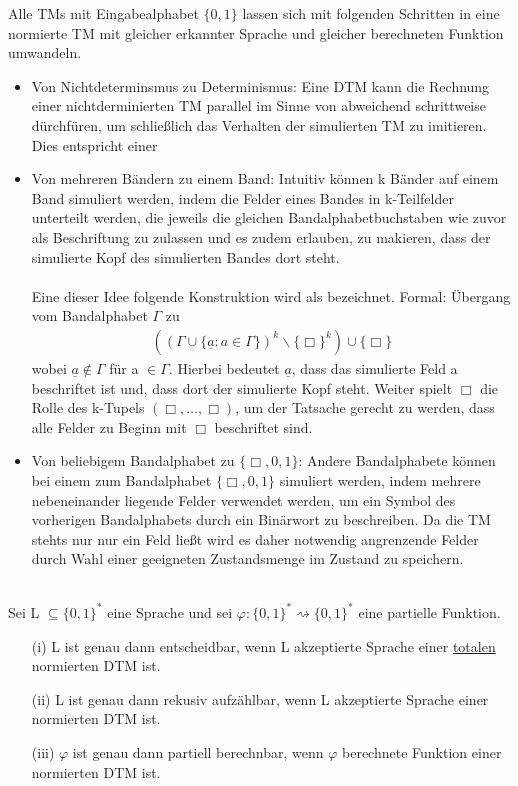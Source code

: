 \documentclass[a4paper]{article}
\begin{document}
 Alle TMs mit Eingabealphabet $\lbrace 0,1 \rbrace$ lassen sich mit folgenden Schritten in eine normierte TM mit gleicher erkannter Sprache und gleicher berechneten Funktion umwandeln.
 \begin{itemize}
  \item Von Nichtdeterminsmus zu Determinismus: Eine DTM kann die Rechnung einer nichtderminierten TM parallel im Sinne von abweichend schrittweise dürchfüren, um schließlich das Verhalten der simulierten TM zu imitieren. Dies entspricht einer 
  \item Von mehreren Bändern zu einem Band: Intuitiv können k Bänder auf einem Band simuliert werden, indem die Felder eines Bandes in k-Teilfelder unterteilt werden, die jeweils die gleichen Bandalphabetbuchstaben wie zuvor als Beschriftung zu zulassen und es zudem erlauben, zu makieren, dass der simulierte Kopf des simulierten Bandes dort steht. \\
  \\
  Eine dieser Idee folgende Konstruktion wird als  bezeichnet. Formal: Übergang vom Bandalphabet $\Gamma$ zu
  \begin{align*}
   ((\Gamma \cup \lbrace \underline{a}: a \in \Gamma \rbrace)^k \backslash \lbrace \Box \rbrace^k) \cup \lbrace \Box \rbrace
  \end{align*}
  wobei $\underline{a} \not \in \Gamma$ für a $\in \Gamma$. Hierbei bedeutet $\underline{a}$, dass das simulierte Feld a beschriftet ist und, dass dort der simulierte Kopf steht. Weiter spielt $\Box$ die Rolle des k-Tupels $(\Box,\dots,\Box)$, um der Tatsache gerecht zu werden, dass alle Felder zu Beginn mit $\Box$ beschriftet sind.
  \item Von beliebigem Bandalphabet zu $\lbrace \Box, 0,1 \rbrace$: Andere Bandalphabete können bei einem  zum Bandalphabet $\lbrace \Box, 0,1 \rbrace$ simuliert werden, indem mehrere nebeneinander liegende Felder verwendet werden, um ein Symbol des vorherigen Bandalphabets durch ein Binärwort zu beschreiben. Da die TM stehts nur nur ein Feld ließt wird es daher notwendig angrenzende Felder durch Wahl einer geeigneten Zustandsmenge im Zustand zu speichern.
 \end{itemize}
 \\ \stepBoxCounter
Sei L $\subseteq \lbrace 0,1 \rbrace^*$ eine Sprache und sei $\varphi : \lbrace 0,1 \rbrace^* \rightsquigarrow \lbrace 0,1 \rbrace^*$ eine partielle Funktion.
\begin{enumerate}
 \item[(i)] L ist genau dann entscheidbar, wenn L akzeptierte Sprache einer \underline{totalen} normierten DTM ist.
 \item[(ii)] L ist genau dann rekusiv aufzählbar, wenn L akzeptierte Sprache einer normierten DTM ist.
 \item[(iii)] $\varphi$ ist genau dann partiell berechnbar, wenn $\varphi$ berechnete Funktion einer normierten DTM ist.
\end{enumerate}
\end{document}
